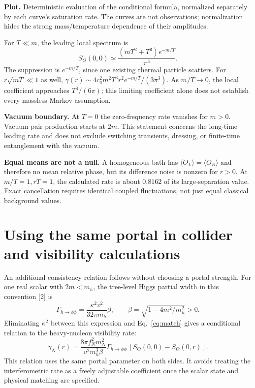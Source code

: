 \documentclass[11pt]{article}
\begin{document}
\textbf{Plot.} Deterministic evaluation of the conditional formula, normalized
separately by each curve's saturation rate. The curves are not observations;
normalization hides the strong mass/temperature dependence of their amplitudes.

For $T\ll m$, the leading local spectrum is
\begin{equation}
 S_O(0,0)\simeq\frac{(mT^2+T^3)e^{-m/T}}{\pi^3}.
\end{equation}
The suppression is $e^{-m/T}$, since one existing thermal particle scatters.
For $r\sqrt{mT}\ll1$ as well,
$\gamma(r)\sim4c_a^2m^2T^3r^2e^{-m/T}/(3\pi^3)$.
As $m/T\to0$, the local coefficient approaches $T^3/(6\pi)$;
this limiting coefficient alone does not establish every massless Markov assumption.

\textbf{Vacuum boundary.} At $T=0$ the zero-frequency rate vanishes for
$m>0$. Vacuum pair production starts at $2m$. This statement concerns the
long-time leading rate and does not exclude switching transients, dressing,
or finite-time entanglement with the vacuum.

\textbf{Equal means are not a null.} A homogeneous bath has
$\langle O_L\rangle=\langle O_R\rangle$ and therefore no mean relative
phase, but its difference noise is nonzero for $r>0$. At $m/T=1,rT=1$,
the calculated rate is about $0.8162$ of its large-separation value.
Exact cancellation requires identical coupled fluctuations, not just equal
classical background values.

\newpage
\section{Using the same portal in collider and visibility calculations}
An additional consistency relation follows without choosing a portal
strength. For one real scalar with $2m<m_h$, the tree-level Higgs partial
width in this convention [2] is
\begin{equation}
 \Gamma_{h\to\phi\phi}=\frac{\kappa^2v^2}{32\pi m_h}\beta,
 \qquad\beta=\sqrt{1-4m^2/m_h^2}>0.
\end{equation}
Eliminating $\kappa^2$ between this expression and Eq.~\eqref{eq:match}
gives a conditional relation to the heavy-nucleon visibility rate:
\begin{equation}
 \boxed{\gamma_N(r)=\frac{8\pi f_N^2m_N^2}{v^2m_h^3\beta}
 \Gamma_{h\to\phi\phi}\,[S_O(0,0)-S_O(0,r)].}\label{eq:collider}
\end{equation}
This relation uses the same portal parameter on both sides. It avoids
treating the interferometric rate as a freely adjustable coefficient once
the scalar state and physical matching are specified.
\end{document}
